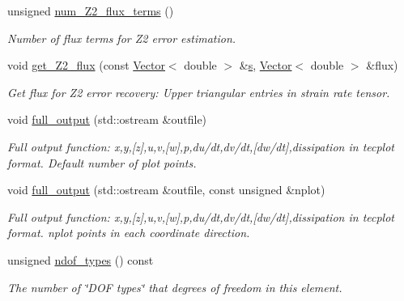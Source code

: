 \begin{DoxyCompactItemize}
unsigned \hyperlink{classoomph_1_1TCrouzeixRaviartElement_af770b1f3d012a9b470375d7d98f3407b}{num\+\_\+\+Z2\+\_\+flux\+\_\+terms} ()
\begin{DoxyCompactList}\small\item\em Number of \textquotesingle{}flux\textquotesingle{} terms for Z2 error estimation. \end{DoxyCompactList}\item 
void \hyperlink{classoomph_1_1TCrouzeixRaviartElement_a7710fd1d14ecd50ee389cac1c57871b6}{get\+\_\+\+Z2\+\_\+flux} (const \hyperlink{classoomph_1_1Vector}{Vector}$<$ double $>$ \&\hyperlink{cfortran_8h_ab7123126e4885ef647dd9c6e3807a21c}{s}, \hyperlink{classoomph_1_1Vector}{Vector}$<$ double $>$ \&flux)
\begin{DoxyCompactList}\small\item\em Get \textquotesingle{}flux\textquotesingle{} for Z2 error recovery\+: Upper triangular entries in strain rate tensor. \end{DoxyCompactList}\item 
void \hyperlink{classoomph_1_1TCrouzeixRaviartElement_afeab02f9b7a31b3befcdf67d40ac495e}{full\+\_\+output} (std\+::ostream \&outfile)
\begin{DoxyCompactList}\small\item\em Full output function\+: x,y,\mbox{[}z\mbox{]},u,v,\mbox{[}w\mbox{]},p,du/dt,dv/dt,\mbox{[}dw/dt\mbox{]},dissipation in tecplot format. Default number of plot points. \end{DoxyCompactList}\item 
void \hyperlink{classoomph_1_1TCrouzeixRaviartElement_a27a2342f56d71bfb17e11925b4674c90}{full\+\_\+output} (std\+::ostream \&outfile, const unsigned \&nplot)
\begin{DoxyCompactList}\small\item\em Full output function\+: x,y,\mbox{[}z\mbox{]},u,v,\mbox{[}w\mbox{]},p,du/dt,dv/dt,\mbox{[}dw/dt\mbox{]},dissipation in tecplot format. nplot points in each coordinate direction. \end{DoxyCompactList}\item 
unsigned \hyperlink{classoomph_1_1TCrouzeixRaviartElement_af9e4fcbc56441522e6111962438a3b4a}{ndof\+\_\+types} () const
\begin{DoxyCompactList}\small\item\em The number of \char`\"{}\+D\+O\+F types\char`\"{} that degrees of freedom in this element. \end{DoxyCompactList}\item 

\end{DoxyCompactItemize}
